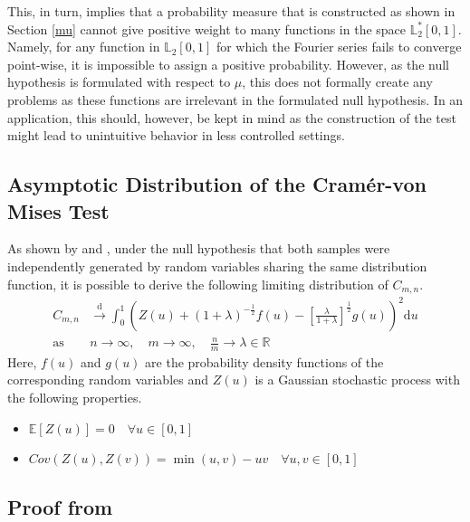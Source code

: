 \documentclass[12pt, a4paper]{article}
\theoremstyle{MAstyle} \newtheorem{assumption}{Assumption}[section]
\theoremstyle{MAstyle} \newtheorem{definition}{Definition}[section]
\theoremstyle{MAstyle} \newtheorem{theorem}{Theorem}[section]
\begin{document}
		\newpage			
		This, in turn, implies that a probability measure that is constructed as shown in Section \ref{mu} cannot give positive weight to many functions in the space $\mathbb{L}_2^{*}[0,1]$. Namely, for any function in $\mathbb{L}_2[0,1]$ for which the Fourier series fails to converge point-wise, it is impossible to assign a positive probability.
		However, as the null hypothesis is formulated with respect to $\mu$, this does not formally create any problems as these functions are irrelevant in the formulated null hypothesis. 	
		In an application, this should, however, be kept in mind as the construction of the test might lead to unintuitive behavior in less controlled settings.
		
		\subsection{Asymptotic Distribution of the Cram\'{e}r-von Mises Test}\label{asymp_CvM}
			As shown by \cite{rosenblatt_limit_1952} and \cite{fisz_result_1960}, under the null hypothesis that both samples were independently generated by random variables sharing the same distribution function, it is possible to derive the following limiting distribution of $C_{m,n}$.
			\begin{equation}
				\begin{split}
					C_{m,n} &\xrightarrow{\text{d}} \int_{0}^{1} \left(Z(u) + \left(1 + \lambda\right)^{-\frac{1}{2}} f(u) - \left[\frac{\lambda}{1+\lambda}\right]^{\frac{1}{2}}g(u)\right)^2 \mathrm{d}u \\
					\text{as} \quad &n \rightarrow \infty, \quad m \rightarrow \infty, \quad \frac{n}{m} \rightarrow \lambda \in \mathbb{R}
				\end{split}
			\end{equation}
			Here, $f(u)$ and $g(u)$ are the probability density functions of the corresponding random variables and $Z(u)$ is a Gaussian stochastic process with the following properties.
			\begin{itemize}
				\item $\mathbb{E}\left[Z(u)\right] = 0 \quad \forall u \in [0,1]$
				\item $Cov\left(Z(u), Z(v)\right) = \min(u,v) - uv \quad \forall u,v \in [0,1]$
			\end{itemize}
		
		\subsection{Proof from \cite{hoeffding_large-sample_1952}}\label{hoeffding}
\end{document}
